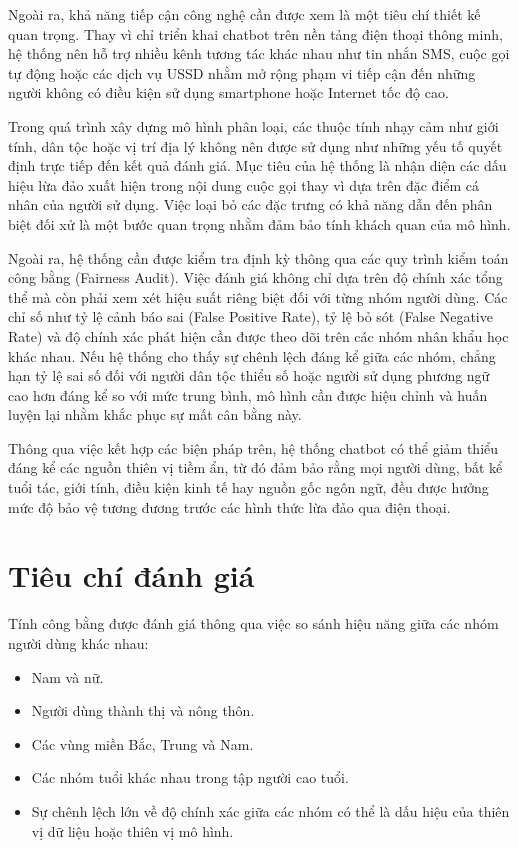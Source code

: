 Ngoài ra, khả năng tiếp cận công nghệ cần được xem là một tiêu chí thiết kế quan trọng. Thay vì chỉ triển khai chatbot trên nền tảng điện thoại thông minh, hệ thống nên hỗ trợ nhiều kênh tương tác khác nhau như tin nhắn SMS, cuộc gọi tự động hoặc các dịch vụ USSD nhằm mở rộng phạm vi tiếp cận đến những người không có điều kiện sử dụng smartphone hoặc Internet tốc độ cao.

Trong quá trình xây dựng mô hình phân loại, các thuộc tính nhạy cảm như giới tính, dân tộc hoặc vị trí địa lý không nên được sử dụng như những yếu tố quyết định trực tiếp đến kết quả đánh giá. Mục tiêu của hệ thống là nhận diện các dấu hiệu lừa đảo xuất hiện trong nội dung cuộc gọi thay vì dựa trên đặc điểm cá nhân của người sử dụng. Việc loại bỏ các đặc trưng có khả năng dẫn đến phân biệt đối xử là một bước quan trọng nhằm đảm bảo tính khách quan của mô hình.

Ngoài ra, hệ thống cần được kiểm tra định kỳ thông qua các quy trình kiểm toán công bằng (Fairness Audit). Việc đánh giá không chỉ dựa trên độ chính xác tổng thể mà còn phải xem xét hiệu suất riêng biệt đối với từng nhóm người dùng. Các chỉ số như tỷ lệ cảnh báo sai (False Positive Rate), tỷ lệ bỏ sót (False Negative Rate) và độ chính xác phát hiện cần được theo dõi trên các nhóm nhân khẩu học khác nhau. Nếu hệ thống cho thấy sự chênh lệch đáng kể giữa các nhóm, chẳng hạn tỷ lệ sai số đối với người dân tộc thiểu số hoặc người sử dụng phương ngữ cao hơn đáng kể so với mức trung bình, mô hình cần được hiệu chỉnh và huấn luyện lại nhằm khắc phục sự mất cân bằng này.

Thông qua việc kết hợp các biện pháp trên, hệ thống chatbot có thể giảm thiểu đáng kể các nguồn thiên vị tiềm ẩn, từ đó đảm bảo rằng mọi người dùng, bất kể tuổi tác, giới tính, điều kiện kinh tế hay nguồn gốc ngôn ngữ, đều được hưởng mức độ bảo vệ tương đương trước các hình thức lừa đảo qua điện thoại.

\section{Tiêu chí đánh giá}
Tính công bằng được đánh giá thông qua việc so sánh hiệu năng giữa các nhóm người dùng khác nhau:
\begin{itemize}
    \item Nam và nữ.
    \item Người dùng thành thị và nông thôn.
    \item Các vùng miền Bắc, Trung và Nam.
    \item Các nhóm tuổi khác nhau trong tập người cao tuổi.
\item Sự chênh lệch lớn về độ chính xác giữa các nhóm có thể là dấu hiệu của thiên vị dữ liệu hoặc thiên vị mô hình.
\end{itemize}
